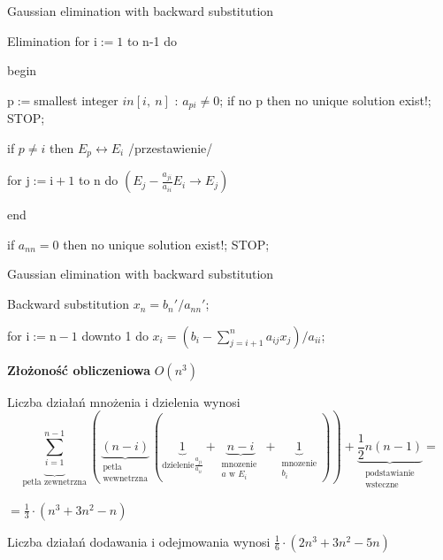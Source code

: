 \begin{frame}{Gaussian elimination with backward substitution}
\begin{exampleblock}{Elimination}
for $\mathrm{i}:=1$ to n-1 do

\hspace{4mm} begin

\hspace{7mm}
$\mathrm{p}:=$smallest integer $in[i,\ n]$ : $a_{pi}\neq 0$;  \newline
\hspace*{7mm} if no $\mathrm{p}$ then no unique solution exist!; STOP;

\hspace{7mm} if $p\neq i$ then $E_{p}\leftrightarrow E_{i}$ /przestawienie/

\hspace{7mm} for $\mathrm{j}:=\mathrm{i}+1$ to $\mathrm{n}$ do $(E_{j}-\displaystyle \frac{a_{ji}}{a_{ii}}E_i\rightarrow E_{j})$

\hspace{4mm} end

if $a_{nn}=0$ then no unique solution exist!; STOP;
    	\end{exampleblock}

\end{frame}
\begin{frame}{Gaussian elimination with backward substitution}
\begin{exampleblock}{Backward substitution}
$x_{n}=b_{n}'/a_{nn}'$;

for $\mathrm{i}:=\mathrm{n}-1$ downto 1 do $x_{i}=(b_{i}-\displaystyle \sum_{j=i+1}^{n}a_{ij}x_{j})/a_{ii}$;
\end{exampleblock}

\textbf{Złożoność obliczeniowa}
$O(n^3)$

Liczba działań mnożenia $\mathrm{i}$ dzielenia wynosi 
$$\underbrace{\sum_{i=1}^{n-1}}_{\text{petla zewnetrzna}}
(\underbrace{(n-i)}_{\substack{ \text{petla}\\ \text{wewnetrzna}}}
(\underbrace{1}_{\text{dzielenie}\frac{a_{ji}}{a_{ii}}}
+\underbrace{n-i}_{\substack{\text{mnozenie }\\ a \text{ w }  E_i}}
+\underbrace{1}_{\substack{\text{mnozenie}  \\  b_i}}))+\underbrace{\frac{1}{2}n(n-1)}_{\substack{\text{podstawianie}  \\ \text{wsteczne}}}=$$

$\displaystyle =\frac{1}{3}\cdot(n^{3}+3n^{2}-n)$

Liczba działań dodawania $\mathrm{i}$ odejmowania wynosi
$\frac{1}{6}\cdot(2n^{3}+3n^{2}-5n)$




\end{frame}
